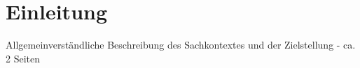 \chapter{Einleitung}%
\thispagestyle{fancy}

Allgemeinverständliche Beschreibung des Sachkontextes und der Zielstellung - ca. 2 Seiten



